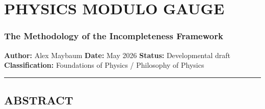 \documentclass[
]{article}
\author{}
\date{}
\begin{document}
\hypertarget{physics-modulo-gauge}{%
\section{PHYSICS MODULO GAUGE}\label{physics-modulo-gauge}}

\hypertarget{the-methodology-of-the-incompleteness-framework}{%
\subsubsection{The Methodology of the Incompleteness
Framework}\label{the-methodology-of-the-incompleteness-framework}}

\textbf{Author:} Alex Maybaum \textbf{Date:} May 2026 \textbf{Status:}
Developmental draft \textbf{Classification:} Foundations of Physics /
Philosophy of Physics

\begin{center}\rule{0.5\linewidth}{0.5pt}\end{center}

\hypertarget{abstract}{%
\subsection{ABSTRACT}\label{abstract}}
\end{document}
